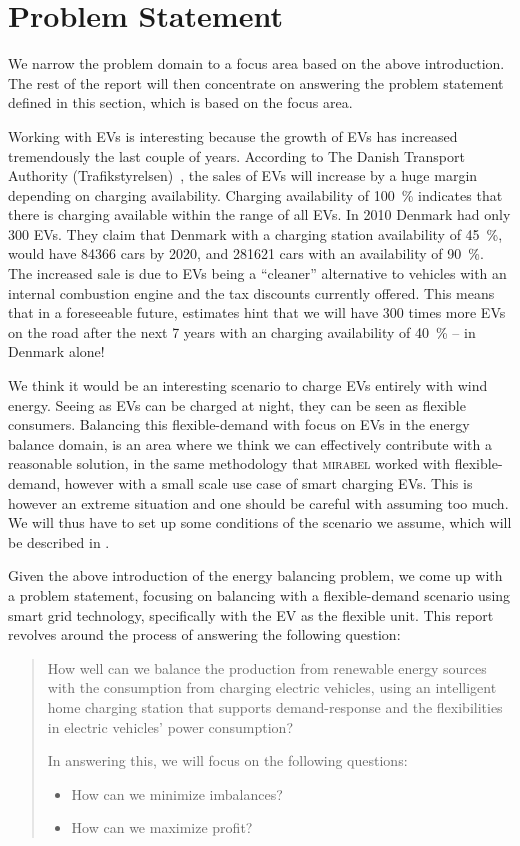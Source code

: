 \section{Problem Statement}\label{sec:problem_statement}
We narrow the problem domain to a focus area based on the above introduction. The rest of the report will then concentrate on answering the problem statement defined in this section, which is based on the focus area. 

Working with EVs is interesting because the growth of EVs has increased tremendously the last couple of years. According to The Danish Transport Authority (Trafikstyrelsen)~\cite[p.~56]{TRAFIKSTYRELSEN2010}, the sales of EVs will increase by a huge margin depending on charging availability. Charging availability of \SI{100}{\percent} indicates that there is charging available within the range of all EVs. In 2010 Denmark had only \num{300} EVs. They claim that Denmark with a charging station availability of \SI{45}{\percent}, would have \num{84366} cars by 2020, and \num{281621} cars with an availability of \SI{90}{\percent}. The increased sale is due to EVs being a ``cleaner'' alternative to vehicles with an internal combustion engine and the tax discounts currently offered. This means that in a foreseeable future, estimates hint that we will have 300 times more EVs on the road after the next 7 years with an charging availability of \SI{40}{\percent} -- in Denmark alone!

We think it would be an interesting scenario to charge EVs entirely with wind energy. Seeing as EVs can be charged at night, they can be seen as flexible consumers. Balancing this flexible-demand with focus on EVs in the energy balance domain, is an area where we think we can effectively contribute with a reasonable solution, in the same methodology that \textsc{mirabel} worked with flexible-demand, however with a small scale use case of smart charging EVs. This is however an extreme situation and one should be careful with assuming too much. We will thus have to set up some conditions of the scenario we assume, which will be described in . 

Given the above introduction of the energy balancing problem, we come up with a problem statement, focusing on balancing with a flexible-demand scenario using smart grid technology, specifically with the EV as the flexible unit. This report revolves around the process of answering the following question: 
\begin{quote}
How well can we balance the production from renewable energy sources with the consumption from charging electric vehicles, using an intelligent home charging station that supports demand-response and the flexibilities in electric vehicles' power consumption?

In answering this, we will focus on the following questions:
\begin{itemize}
  \item How can we minimize imbalances?
  \item How can we maximize profit?
\end{itemize}
\end{quote}

